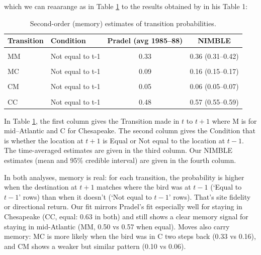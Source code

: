 \documentclass[
  12pt,
]{krantz}
\begin{document}
which we can reaarange as in Table \ref{tab:memoryres} to the results obtained by \citet{pradel_multievent_2005} in his Table 1:

\begin{table}
\centering
\caption{\label{tab:memoryres}Second-order (memory) estimates of transition probabilities.}
\centering
\begin{tabular}[t]{llcc}
\toprule
Transition & Condition & Pradel (avg 1985–88) & NIMBLE\\
\midrule
\cellcolor{gray!10}{MM} & \cellcolor{gray!10}{Equal to t-1} & \cellcolor{gray!10}{0.57} & \cellcolor{gray!10}{0.50 (0.49–0.52)}\\
MM & Not equal to t-1 & 0.33 & 0.36 (0.31–0.42)\\
\cellcolor{gray!10}{MC} & \cellcolor{gray!10}{Equal to t-1} & \cellcolor{gray!10}{0.27} & \cellcolor{gray!10}{0.33 (0.27–0.38)}\\
MC & Not equal to t-1 & 0.09 & 0.16 (0.15–0.17)\\
\cellcolor{gray!10}{CM} & \cellcolor{gray!10}{Equal to t-1} & \cellcolor{gray!10}{0.21} & \cellcolor{gray!10}{0.10 (0.09–0.11)}\\
\addlinespace
CM & Not equal to t-1 & 0.05 & 0.06 (0.05–0.07)\\
\cellcolor{gray!10}{CC} & \cellcolor{gray!10}{Equal to t-1} & \cellcolor{gray!10}{0.63} & \cellcolor{gray!10}{0.63 (0.61–0.64)}\\
CC & Not equal to t-1 & 0.48 & 0.57 (0.55–0.59)\\
\bottomrule
\end{tabular}
\end{table}

\justifying

In Table \ref{tab:memoryres}, the first column gives the Transition made in \(t\) to \(t+1\) where M is for mid--Atlantic and C for Chesapeake. The second column gives the Condition that is whether the location at \(t+1\) is Equal or Not equal to the location at \(t-1\). The \citet{pradel_multievent_2005} time-averaged estimates are given in the third column. Our NIMBLE estimates (mean and 95\% credible interval) are given in the fourth column.

In both analyses, memory is real: for each transition, the probability is higher when the destination at \(t+1\) matches where the bird was at \(t−1\) (`Equal to \(t-1\)' rows) than when it doesn't (`Not equal to \(t-1\)' rows). That's site fidelity or directional return. Our fit mirrors Pradel's fit especially well for staying in Chesapeake (CC, equal: 0.63 in both) and still shows a clear memory signal for staying in mid-Atlantic (MM, 0.50 vs 0.57 when equal). Moves also carry memory: MC is more likely when the bird was in C two steps back (0.33 vs 0.16), and CM shows a weaker but similar pattern (0.10 vs 0.06).
\end{document}
